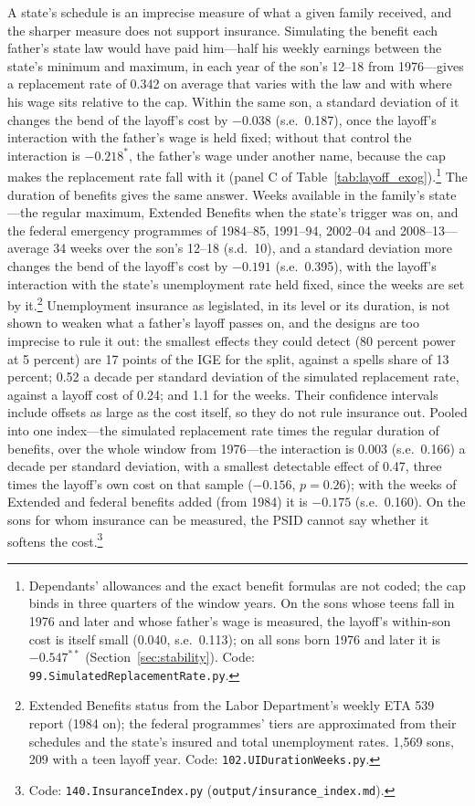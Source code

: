 A state's schedule is an imprecise measure of what a given family received, and the sharper measure does not support
insurance. Simulating the benefit each father's state law would have paid him---half his weekly earnings between the
state's minimum and maximum, in each year of the son's 12--18 from 1976---gives a replacement rate of 0.342 on average
that varies with the law and with where his wage sits relative to the cap. Within the same son, a standard deviation of
it changes the bend of the layoff's cost by $-0.038$ (s.e.\ 0.187), once the layoff's interaction with the father's
wage is held fixed; without that control the interaction is $-0.218^{*}$, the father's wage under another name, because
the cap makes the replacement rate fall with it (panel C of Table~\ref{tab:layoff_exog}).\footnote{Dependants'
allowances and the exact benefit formulas are not coded; the cap binds in three quarters of the window years. On the sons
whose teens fall in 1976 and later and whose father's wage is measured, the layoff's within-son cost is itself small
(0.040, s.e.\ 0.113); on all sons born 1976 and later it is $-0.547^{**}$ (Section~\ref{sec:stability}). Code:
\texttt{99.SimulatedReplacementRate.py}.} The duration of benefits gives the same answer. Weeks available in the
family's state---the regular maximum, Extended Benefits when the state's trigger was on, and the federal emergency
programmes of 1984--85, 1991--94, 2002--04 and 2008--13---average 34 weeks over the son's 12--18 (s.d.\ 10), and a
standard deviation more changes the bend of the layoff's cost by $-0.191$ (s.e.\ 0.395), with the layoff's interaction
with the state's unemployment rate held fixed, since the weeks are set by it.\footnote{Extended Benefits status from the
Labor Department's weekly ETA 539 report (1984 on); the federal programmes' tiers are approximated from their schedules
and the state's insured and total unemployment rates. 1,569 sons, 209 with a teen layoff year. Code:
\texttt{102.UIDurationWeeks.py}.} Unemployment insurance as legislated, in its level or its duration, is not shown to
weaken what a father's layoff passes on, and the designs are too imprecise to rule it out: the smallest effects they could
detect (80 percent power at 5 percent) are 17 points of the IGE for the split, against a spells share of 13 percent;
0.52 a decade per standard deviation of the simulated replacement rate, against a layoff cost of 0.24; and 1.1 for the
weeks. Their confidence intervals include offsets as large as the cost itself, so they do not rule insurance out.
Pooled into one index---the simulated replacement rate times the regular duration of benefits, over the whole
window from 1976---the interaction is 0.003 (s.e.\ 0.166) a decade per standard deviation, with a smallest detectable
effect of 0.47, three times the layoff's own cost on that sample ($-0.156$, $p = 0.26$); with the weeks of Extended
and federal benefits added (from 1984) it is $-0.175$ (s.e.\ 0.160). On the sons for whom insurance can be measured,
the PSID cannot say whether it softens the cost.\footnote{Code: \texttt{140.InsuranceIndex.py}
(\texttt{output/insurance\_index.md}).}

